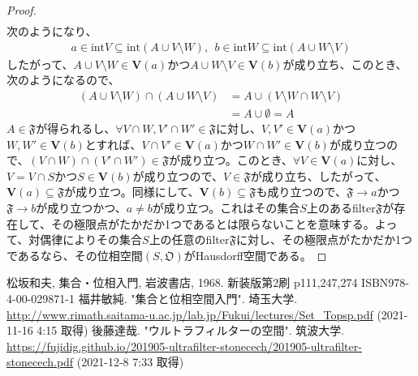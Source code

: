 \documentclass[dvipdfmx]{jsarticle}
\begin{document}
\begin{proof}
\begin{align*}
\end{align*}
次のようになり、
\begin{align*}
a \in {\mathrm{int}}V \subseteq {\mathrm{int}}(A \cup V \setminus W),\ \ b \in {\mathrm{int}}W \subseteq {\mathrm{int}}(A \cup W \setminus V)
\end{align*}
したがって、$A \cup V \setminus W \in \mathbf{V}(a)$かつ$A \cup W \setminus V \in \mathbf{V}(b)$が成り立ち、このとき、次のようになるので、
\begin{align*}
(A \cup V \setminus W) \cap (A \cup W \setminus V) &= A \cup (V \setminus W \cap W \setminus V)\\
&= A \cup \emptyset = A
\end{align*}
$A \in \mathfrak{F}$が得られるし、$\forall V \cap W,V' \cap W'\in \mathfrak{F}$に対し、$V,V' \in \mathbf{V}(a)$かつ$W,W' \in \mathbf{V}(b)$とすれば、$V \cap V' \in \mathbf{V}(a)$かつ$W \cap W' \in \mathbf{V}(b)$が成り立つので、$(V \cap W) \cap \left( V' \cap W' \right)\in \mathfrak{F}$が成り立つ。このとき、$\forall V \in \mathbf{V}(a)$に対し、$V = V \cap S$かつ$S \in \mathbf{V}(b)$が成り立つので、$V \in \mathfrak{F}$が成り立ち、したがって、$\mathbf{V}(a)\subseteq \mathfrak{F}$が成り立つ。同様にして、$\mathbf{V}(b)\subseteq \mathfrak{F}$も成り立つので、$\mathfrak{F} \rightarrow a$かつ$\mathfrak{F} \rightarrow b$が成り立つかつ、$a \neq b$が成り立つ。これはその集合$S$上のあるfilter$\mathfrak{F}$が存在して、その極限点がたかだか1つであるとは限らないことを意味する。よって、対偶律によりその集合$S$上の任意のfilter$\mathfrak{F}$に対し、その極限点がたかだか1つであるなら、その位相空間$\left( S,\mathfrak{O} \right)$がHausdorff空間である。
\end{proof}\par
\begin{thebibliography}{50}
  松坂和夫, 集合・位相入門, 岩波書店, 1968. 新装版第2刷 p111,247,274 ISBN978-4-00-029871-1
  福井敏純. "集合と位相空間入門". 埼玉大学. \url{http://www.rimath.saitama-u.ac.jp/lab.jp/Fukui/lectures/Set_Topsp.pdf} (2021-11-16 4:15 取得)
  後藤達哉. "ウルトラフィルターの空間". 筑波大学. \url{https://fujidig.github.io/201905-ultrafilter-stonecech/201905-ultrafilter-stonecech.pdf} (2021-12-8 7:33 取得)
\end{thebibliography}
\end{document}
